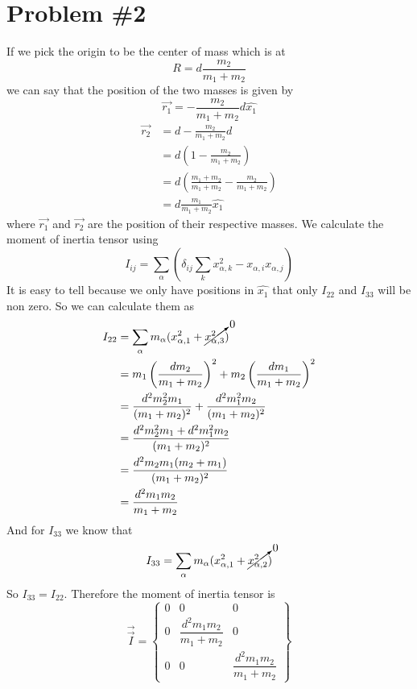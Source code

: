 \documentclass[11pt]{article}
\numberwithin{equation}{section}
\begin{document}
\section{Problem \#2}
If we pick the origin to be the center of mass which is at 
$$R = d\frac{m_2}{m_1+m_2}$$
we can say that the position of the two masses is given by
$$\vec{r_1} = -\frac{m_2}{m_1+m_2}d\hat{x_1}$$
\begin{align*}
\vec{r_2} &= d-\frac{m_2}{m_1+m_2}d\\
&= d\left(1-\frac{m_2}{m_1+m_2}\right)\\
&= d\left(\frac{m_1+m_2}{m_1+m_2}-\frac{m_2}{m_1+m_2}\right)\\
&= d\frac{m_1}{m_1+m_2}\hat{x_1}
\end{align*}
where $\vec{r_1}$ and $\vec{r_2}$ are the position of their respective masses. We calculate the moment of inertia tensor using 
$$I_{ij} = \sum_{\alpha}\left(\delta_{ij}\sum_kx^2_{\alpha,k}-x_{\alpha,i}x_{\alpha,j}\right)$$
It is easy to tell because we only have positions in $\hat{x_1}$ that only $I_{22}$ and $I_{33}$ will be non zero. So we can calculate them as
\begin{align*}
I_{22} &= \sum_{\alpha}m_{\alpha}(x^2_{\alpha,1}+\cancelto{0}{x^2_{\alpha,3}})\\
&= m_1\left(\frac{dm_2}{m_1+m_2}\right)^2 + m_2\left(\frac{dm_1}{m_1+m_2}\right)^2\\
&= \frac{d^2m_2^2m_1}{(m_1+m_2)^2} + \frac{d^2m_1^2m_2}{(m_1+m_2)^2}\\
&= \frac{d^2m_2^2m_1+d^2m_1^2m_2}{(m_1+m_2)^2}\\
&= \frac{d^2m_2m_1(m_2+m_1)}{(m_1+m_2)^2}\\
&= \frac{d^2m_1m_2}{m_1+m_2}
\end{align*}
And for $I_{33}$ we know that
$$I_{33} = \sum_{\alpha}m_{\alpha}(x^2_{\alpha,1}+\cancelto{0}{x^2_{\alpha,2}})$$
So $I_{33}=I_{22}$. Therefore the moment of inertia tensor is 
$$\vec{\vec{I}} = \left\{\begin{array}{ccc}
	0	&0				&0\\
	0	&\dfrac{d^2m_1m_2}{m_1+m_2}	&0\\
	0	&0				&\dfrac{d^2m_1m_2}{m_1+m_2}
		\end{array}\right\}$$
\end{document}
